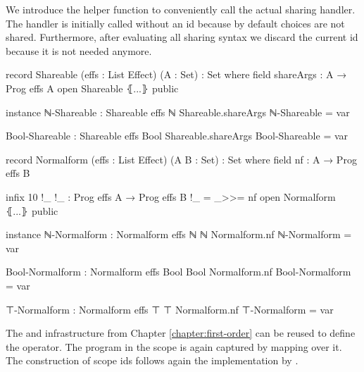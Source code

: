 We introduce the helper function  to conveniently call
the actual sharing handler.
The handler is initially called without an id because by default choices are
not shared.
Furthermore, after evaluating all sharing syntax we discard the current id
because it is not needed anymore.

\begin{code}[hide]
record Shareable (effs : List Effect) (A : Set) : Set where
  field shareArgs : A → Prog effs A
open Shareable ⦃...⦄ public

instance
  ℕ-Shareable : Shareable effs ℕ
  Shareable.shareArgs ℕ-Shareable = var

  Bool-Shareable : Shareable effs Bool
  Shareable.shareArgs Bool-Shareable = var

record Normalform (effs : List Effect) (A B : Set) : Set where
  field nf : A → Prog effs B

  infix 10 !_
  !_ : Prog effs A → Prog effs B
  !_ = _>>= nf
open Normalform ⦃...⦄ public

instance
  ℕ-Normalform : Normalform effs ℕ ℕ
  Normalform.nf ℕ-Normalform = var

  Bool-Normalform : Normalform effs Bool Bool
  Normalform.nf Bool-Normalform = var

  ⊤-Normalform : Normalform effs ⊤ ⊤
  Normalform.nf ⊤-Normalform = var
\end{code}

The  and  infrastructure from
Chapter \ref{chapter:first-order} can be reused to define the
 operator.
The program in the scope is again captured by mapping  over it.
The construction of scope ids follows again the implementation by
\textcite{bunkenburg2019modeling}.

